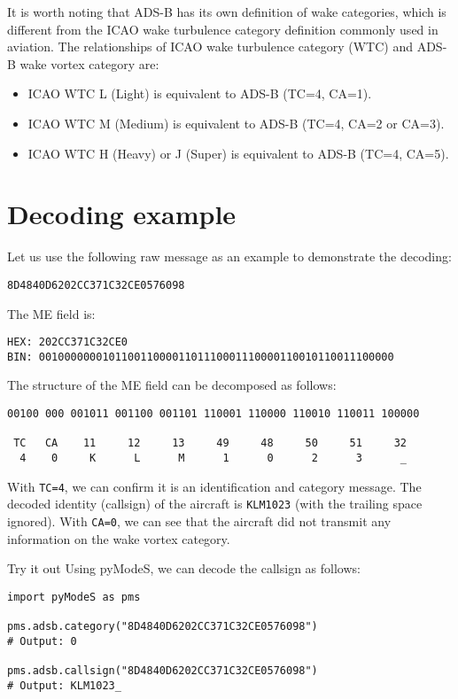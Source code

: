 It is worth noting that ADS-B has its own definition of wake categories, which is different from the ICAO wake turbulence category definition commonly used in aviation. The relationships of ICAO wake turbulence category (WTC) and ADS-B wake vortex category are:

\begin{itemize}
    \item ICAO WTC L (Light) is equivalent to ADS-B (TC=4, CA=1). 
    \item ICAO WTC M (Medium) is equivalent to ADS-B (TC=4, CA=2 or CA=3). 
    \item ICAO WTC H (Heavy) or J (Super) is equivalent to ADS-B (TC=4, CA=5). 
\end{itemize}


\section{Decoding example}

Let us use the following raw message as an example to demonstrate the decoding:

\begin{verbatim}
8D4840D6202CC371C32CE0576098
\end{verbatim}

The ME field is:

\begin{verbatim}
HEX: 202CC371C32CE0
BIN: 00100000001011001100001101110001110000110010110011100000
\end{verbatim}

The structure of the ME field can be decomposed as follows:

\begin{verbatim}
00100 000 001011 001100 001101 110001 110000 110010 110011 100000 

 TC   CA    11     12     13     49     48     50     51     32     
  4    0     K      L      M      1      0      2      3      _      
\end{verbatim}

With \texttt{TC=4}, we can confirm it is an identification and category message. The decoded identity (callsign) of the aircraft is \texttt{KLM1023} (with the trailing space ignored). With \texttt{CA=0}, we can see that the aircraft did not transmit any information on the wake vortex category.

\begin{notebox}{Try it out}
Using pyModeS, we can decode the callsign as follows:

\begin{verbatim}
import pyModeS as pms

pms.adsb.category("8D4840D6202CC371C32CE0576098")
# Output: 0

pms.adsb.callsign("8D4840D6202CC371C32CE0576098")
# Output: KLM1023_
\end{verbatim}

\end{notebox}
 
  
